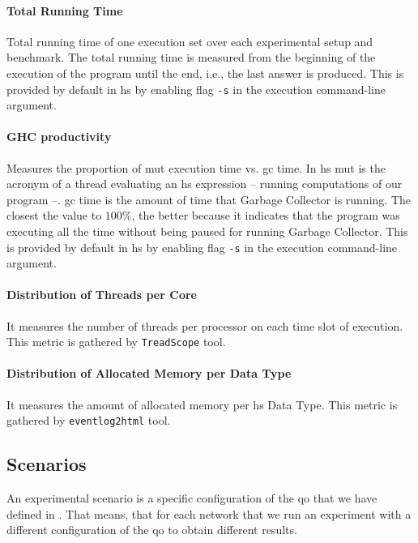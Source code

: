 \paragraph{Total Running Time} Total running time of one execution set over each experimental setup and benchmark. 
The total running time is measured from the beginning of the execution of the program until the end, i.e., the last answer is produced.
This is provided by default in \acrshort{hs} by enabling flag \texttt{-s} in the execution command-line argument.

\paragraph{GHC productivity} Measures the proportion of \acrfull{mut} execution time vs. \acrfull{gc} time. 
In \acrlong{hs} \acrlong{mut} is the acronym of a thread evaluating an \acrshort{hs} expression -- running computations of our program --. 
\acrshort{gc} time is the amount of time that Garbage Collector is running. 
The closest the value to $100\%$, the better because it indicates that the program was executing all the time without being paused for running Garbage Collector. 
This is provided by default in \acrshort{hs} by enabling flag \texttt{-s} in the execution command-line argument.

\paragraph{Distribution of Threads per Core} It measures the number of threads per processor on each time slot of execution.
This metric is gathered by \texttt{TreadScope} \cite{threadscope} tool.

\paragraph{Distribution of Allocated Memory per Data Type} It measures the amount of allocated memory per \acrshort{hs} Data Type. 
This metric is gathered by \texttt{eventlog2html} \cite{eventlog2html} tool.
    
\subsection{Scenarios}\label{sub:exp:exp-data-setup}
An experimental scenario is a specific configuration of the \acrfull{qo} that we have defined in . 
That means, that for each network that we run an experiment with a different configuration of the \acrshort{qo} to obtain different results.

